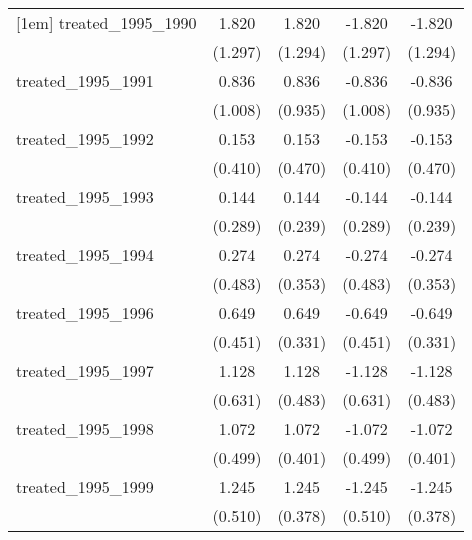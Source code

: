{\begin{tabular}{l*{4}{c}}
[1em]
treated\_1995\_1990&       1.820         &       1.820         &      -1.820         &      -1.820         \\
            &     (1.297)         &     (1.294)         &     (1.297)         &     (1.294)         \\
[1em]
treated\_1995\_1991&       0.836         &       0.836         &      -0.836         &      -0.836         \\
            &     (1.008)         &     (0.935)         &     (1.008)         &     (0.935)         \\
[1em]
treated\_1995\_1992&       0.153         &       0.153         &      -0.153         &      -0.153         \\
            &     (0.410)         &     (0.470)         &     (0.410)         &     (0.470)         \\
[1em]
treated\_1995\_1993&       0.144         &       0.144         &      -0.144         &      -0.144         \\
            &     (0.289)         &     (0.239)         &     (0.289)         &     (0.239)         \\
[1em]
treated\_1995\_1994&       0.274         &       0.274         &      -0.274         &      -0.274         \\
            &     (0.483)         &     (0.353)         &     (0.483)         &     (0.353)         \\
[1em]
treated\_1995\_1996&       0.649         &       0.649\sym{*}  &      -0.649         &      -0.649\sym{*}  \\
            &     (0.451)         &     (0.331)         &     (0.451)         &     (0.331)         \\
[1em]
treated\_1995\_1997&       1.128         &       1.128\sym{*}  &      -1.128         &      -1.128\sym{*}  \\
            &     (0.631)         &     (0.483)         &     (0.631)         &     (0.483)         \\
[1em]
treated\_1995\_1998&       1.072\sym{*}  &       1.072\sym{**} &      -1.072\sym{*}  &      -1.072\sym{**} \\
            &     (0.499)         &     (0.401)         &     (0.499)         &     (0.401)         \\
[1em]
treated\_1995\_1999&       1.245\sym{*}  &       1.245\sym{***}&      -1.245\sym{*}  &      -1.245\sym{***}\\
            &     (0.510)         &     (0.378)         &     (0.510)         &     (0.378)         \\

\end{tabular}}
